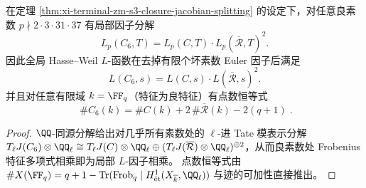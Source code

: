 \begin{corollary}\label{cor:xi-terminal-zm-s3-closure-hasse-weil-factorization}
在定理 \ref{thm:xi-terminal-zm-s3-closure-jacobian-splitting} 的设定下，对任意良素数 \(p\nmid 2\cdot 3\cdot 31\cdot 37\) 有局部因子分解
\[
L_p(C_6,T)=L_p(C,T)\cdot L_p(\overline{\mathcal R},T)^2.
\]
因此全局 Hasse--Weil \(L\)-函数在去掉有限个坏素数 Euler 因子后满足
\[
L(C_6,s)=L(C,s)\cdot L(\overline{\mathcal R},s)^2.
\]
并且对任意有限域 \(k=\FF_q\)（特征为良特征）有点数恒等式
\[
\boxed{\;
\#C_6(k)=\#C(k)+2\,\#\overline{\mathcal R}(k)-2(q+1)\; }.
\]
\end{corollary}
\begin{proof}
\(\QQ\)-同源分解给出对几乎所有素数处的 \(\ell\)-进 Tate 模表示分解
\(
T_\ell J(C_6)\otimes\QQ_\ell\cong T_\ell J(C)\otimes\QQ_\ell\oplus (T_\ell J(\overline{\mathcal R})\otimes\QQ_\ell)^{\oplus 2}
\)，从而良素数处 Frobenius 特征多项式相乘即为局部 \(L\)-因子相乘。
点数恒等式由
\(
\#X(\FF_q)=q+1-\mathrm{Tr}(\mathrm{Frob}_q\mid H^1_{\text{ét}}(X_{\overline{k}},\QQ_\ell))
\)
与迹的可加性直接推出。
\end{proof}

